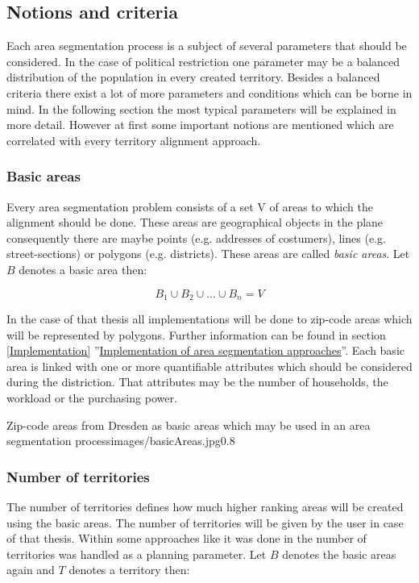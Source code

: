 \subsection{Notions and criteria}\label{notions}
Each area segmentation process is a subject of several parameters that should be considered. In the case of political restriction one parameter may be a balanced distribution of the population in every created territory. Besides a balanced criteria there exist a lot of more parameters and conditions which can be borne in mind. In the following section the most typical parameters will be explained in more detail. However at first some important notions are mentioned which are correlated with every territory alignment approach.

\subsubsection{Basic areas}
Every area segmentation problem consists of a set V of areas to which the alignment should be done. These areas are geographical objects in the plane consequently there are maybe points (e.g. addresses of costumers), lines (e.g. street-sections) or polygons (e.g. districts). These areas are called \textit{basic areas}. Let $ B $ denotes a basic area then:

\[ \mathit{B_{1} \cup B_{2} \cup ... \cup B_{n}=V} \]

In the case of that thesis all implementations will be done to zip-code areas which will be represented by polygons. Further information can be found in section \ref{Implementation} ''\hyperref[Implementation]{Implementation of area segmentation approaches}''. Each basic area is linked with one or more quantifiable attributes which should be considered during the distriction. That attributes may be the number of households, the workload or the purchasing power.

\begin{figurevarSize}{Zip-code areas from Dresden as basic areas which may be used in an area segmentation process}{images/basicAreas.jpg}{0.8}\end{figurevarSize}

\subsubsection{Number of territories}
The number of territories defines how much higher ranking areas will be created using the basic areas. The number of territories will be given by the user in case of that thesis. Within some approaches like it was done in \citeauthor{kalcsics} \cite{kalcsics} the number of territories was handled as a planning parameter. Let $ B $ denotes the basic areas again and $ T $ denotes a territory then:

